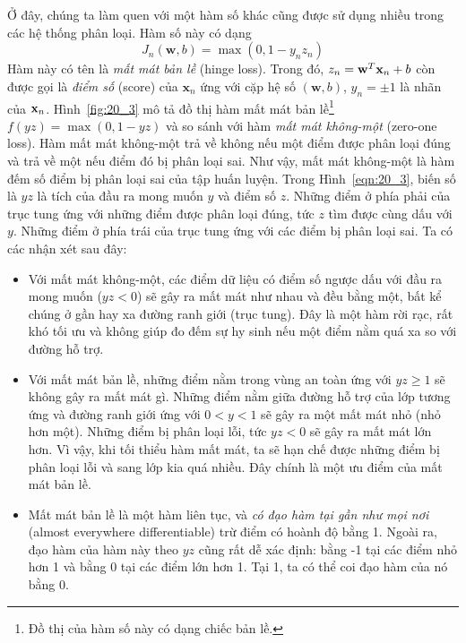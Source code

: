 Ở đây, chúng ta làm quen với một hàm số khác cũng được sử dụng nhiều trong các hệ thống phân loại. Hàm số này có dạng
\begin{equation*}
J_n(\mathbf{w}, b) = \max(0, 1 - y_nz_n)
\end{equation*}
Hàm này có tên là \textit{mất mát bản lề} (hinge loss). Trong đó, $z_n = \mathbf{w}^T\mathbf{x}_n + b$ còn được gọi là \textit{điểm số} (score) của $\mathbf{x}_n$ ứng với cặp hệ số $(\mathbf{w},
b)$, $y_n = \pm 1$ là nhãn của $\mathbf{x}_n$. Hình~\ref{fig:20_3} mô tả đồ thị hàm mất mát bản lề\footnote{Đồ thị của hàm số này có dạng chiếc bản lề.} $f(yz) = \max(0, 1 - yz)$ và
so sánh với hàm \textit{mất mát không-một}
({zero-one loss}). Hàm mất mát không-một trả về không nếu một điểm được phân loại đúng và trả về một nếu điểm đó bị phân loại sai. Như vậy, mất mát không-một là hàm {đếm số điểm bị
phân loại sai} của tập huấn luyện. Trong Hình~\ref{eqn:20_3}, biến số là $yz$ là tích của đầu ra
mong muốn $y$ và điểm số $z$. Những điểm ở phía phải của trục
tung ứng với những điểm được phân loại đúng, tức $z$ tìm được cùng dấu với $y$.
Những điểm ở phía trái của trục tung ứng với các điểm bị phân loại sai. Ta có
các nhận xét sau đây:
\begin{itemize}
\item Với mất mát không-một, các điểm dữ liệu có điểm số ngược dấu
với đầu ra mong muốn ($yz < 0$) sẽ gây ra mất mát như nhau và đều bằng một, bất kể
chúng ở gần hay xa đường ranh giới (trục tung). Đây là một hàm rời rạc, rất
khó tối ưu và không giúp đo đếm sự hy sinh nếu một điểm nằm quá xa so với đường hỗ trợ.

\item Với mất mát bản lề, những điểm nằm trong vùng an toàn ứng
với $yz \geq 1$ sẽ không gây ra mất mát gì. Những điểm nằm giữa đường hỗ trợ của
lớp tương ứng và đường ranh giới ứng với $0 < y < 1$ sẽ gây
ra một mất mát nhỏ (nhỏ hơn một). Những điểm bị phân loại lỗi, tức $yz
< 0$ sẽ gây ra mất mát lớn hơn. Vì vậy, khi tối thiểu hàm mất mát, ta sẽ
hạn chế được những điểm bị phân loại lỗi và sang lớp kia quá nhiều. Đây chính là một ưu điểm của mất mát bản lề.

\item Mất mát bản lề là một hàm liên tục, và \textit{có đạo hàm tại gần
như mọi nơi} ({almost everywhere differentiable}) trừ điểm có hoành độ bằng 1. Ngoài ra, đạo hàm của hàm này theo $yz$ cũng rất dễ xác định: bằng -1 tại các điểm nhỏ hơn 1 và bằng 0 tại các điểm lớn hơn 1. Tại 1, ta có thể coi đạo hàm của nó bằng 0.
\end{itemize}



